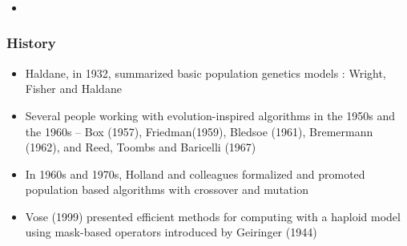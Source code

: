\documentclass[aspectratio=169]{beamer}
\begin{document}
  \begin{frame}
    \frametitle{}
    \begin{itemize}
      \item{}      
    \end{itemize}
  \end{frame}
  
  
  
  
  
  \begin{frame}
    \frametitle{History}
    \begin{itemize}
      \item{Haldane, in 1932, summarized basic population genetics  models : Wright, Fisher and Haldane}
      \item{Several people working with evolution-inspired algorithms in the 1950s and the 1960s –  
      Box (1957), Friedman(1959), Bledsoe (1961), Bremermann (1962), and Reed, Toombs and Baricelli (1967) }
      \item{In 1960s and 1970s, Holland and colleagues formalized  and promoted population based algorithms with crossover and mutation }
      \item{Vose (1999) presented efficient methods for computing with a haploid model using mask-based operators introduced by Geiringer (1944)}
    \end{itemize}
  \end{frame}
  
\end{document}
